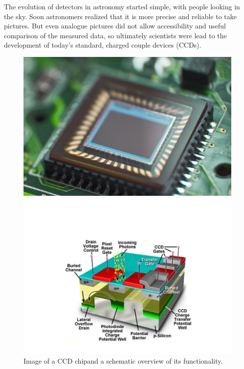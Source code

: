 The evolution of detectors in astronomy started simple, with people looking in the sky. Soon astronomers realized that it is more precise and reliable to take pictures. But even analogue pictures did not allow accessibility and useful comparison of the measured data, so ultimately scientists were lead to the development of today's standard, charged couple devices (CCDs). 
\begin{figure}[H]
\vspace{-1cm}
\begin{minipage}{0.4\textwidth}
\hspace{0.7cm}
		\includegraphics[scale = 0.48]{figures/Introduction/ccd1}
\end{minipage}
\begin{minipage}{0.4\textwidth}
\vspace{-1cm}
		\includegraphics[scale=0.35]{figures/Introduction/ccd2}
\end{minipage}
\caption[Image of a CCD chip and a schematic overview of its functionality.]{Image of a CCD chip\footnotemark and a schematic overview of its functionality\footnotemark .} 
\end{figure} 

